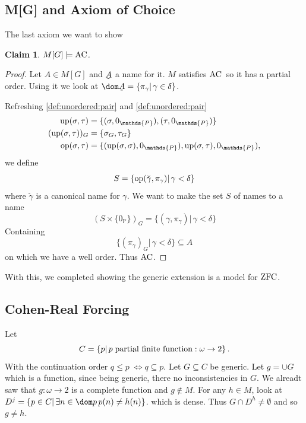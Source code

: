 \documentclass[11pt,pdftex,twoside,a4paper]{article}
\newcommand{\AC}{\ensuremath{\mathop{\rm AC}\nolimits}}
\newcommand{\dsP}{\ensuremath{\mathds{P}}}
\newcommand{\op}{\ensuremath{\mathop{\rm op}\nolimits}}
\newcommand{\up}{\ensuremath{\mathop{\rm up}\nolimits}}
\newcommand{\utilde}[1]{\ensuremath{\underaccent{\tilde}{#1}}}
\newcommand{\ZFC}{\ensuremath{\mathop{\rm ZFC}\nolimits}}
\newtheorem{claim}[thm]{Claim}
\theoremstyle{definition}
\begin{document}
\subsection{M[G] and Axiom of Choice}

The last axiom we want to show
\begin{claim}
\(M[G] \models \AC\).
\end{claim}
\begin{proof}
Let \(A\in M[G]\) and \utilde{A} a name for it.
$M$ satisfies \AC\ so it has a partial order. Using it
we look at
\(\dom\utilde{A} = \{\pi_\gamma|\,\gamma\in\delta\}\).

Refreshing \ref{def:unordered:pair} and \ref{def:unordered:pair}
\begin{align*}
\up(\sigma,\tau) &= \{(\sigma,0_\dsP),(\tau,0_\dsP)\} \\
(\up(\sigma,\tau))_G &= \{\sigma_G,\tau_G\} \\
\op(\sigma,\tau) &= \{(\up(\sigma,\sigma),0_\dsP), \up(\sigma,\tau),0_\dsP),
\end{align*}
we define
\begin{equation*}
S = \{\op(\breve{\gamma},\pi_\gamma)|\,\gamma<\delta\}
\end{equation*}
where \(\breve{\gamma}\) is a canonical name for \(\gamma\).
We want to make the set $S$ of names to a name
\begin{equation*}
(S\times\{0_\dsP\})_G = \{(\gamma,\pi_\gamma)|\, \gamma<\delta\}
\end{equation*}
Containing
\begin{equation*}
\{(\pi_\gamma)_G|\,\gamma<\delta\} \subseteq A
\end{equation*}
on which we have a well order. Thus \AC.
\end{proof}

With this, we completed showing the generic extension is a model for \ZFC.

\subsection{Cohen-Real Forcing}

Let
\begin{equation*}
C = \left\{p|\, p\;\textnormal{partial finite function}: \omega\to 2\right\}.
\end{equation*}
With the continuation order \(q\leq p\;\Leftrightarrow q \subseteq p\).
Let \(G\subseteq C\) be generic. Let \(g=\cup G\)
which is a function, since being generic, there no inconsistencies in $G$.
We alreadt saw that \(g:\omega \to 2\) is a complete function
and \(g\notin M\).
For any \(h\in M\), look at
\(D^j = \{p\in C|\, \exists n\in\dom p\, p(n)\neq h(n)\}\).
which is dense. Thus \(G\cap D^h\neq\emptyset\) and so \(g\neq h\).
\end{document}
